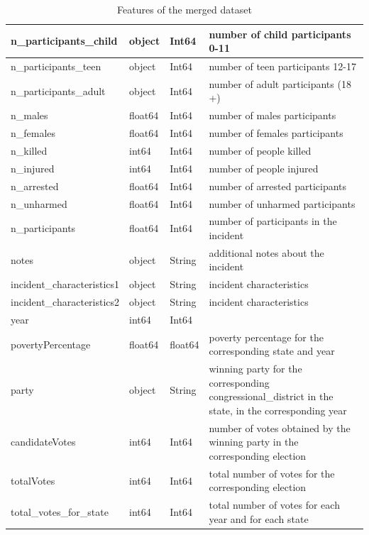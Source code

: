 \documentclass[10pt,a4paper]{report}
\begin{document}
\begin{table}
\begin{small}
\begin{tabular}{|l|l|l|p{7cm}|}
		\hline
		n\_participants\_child & object & Int64 & number of child participants 0-11\\
		\hline
		n\_participants\_teen & object & Int64 & number of teen participants 12-17\\
		\hline
		n\_participants\_adult & object & Int64 & number of adult participants (18 +)\\
		\hline
		n\_males & float64 & Int64 & number of males participants\\
		\hline
		n\_females & float64 & Int64 & number of females participants\\
		\hline
		n\_killed & int64 & Int64 & number of people killed\\
		\hline
		n\_injured & int64 & Int64 & number of people injured\\
		\hline
		n\_arrested & float64 & Int64 & number of arrested participants\\
		\hline
		n\_unharmed & float64 & Int64 & number of unharmed participants\\
		\hline
		n\_participants & float64 & Int64 & number of participants in the incident\\
		\hline
		notes & object & String & additional notes about the incident\\
		\hline
		incident\_characteristics1 & object & String & incident characteristics\\
		\hline
		incident\_characteristics2 & object & String & incident characteristics\\
		\hline
		year & int64 & Int64 & \\
		\hline
		povertyPercentage & float64 & float64 & poverty percentage for the corresponding state and year\\
		\hline
		party & object & String & winning party for the corresponding congressional\_district in the state, in the corresponding year\\
		\hline
		candidateVotes & int64 & Int64 & number of votes obtained by the winning party in the corresponding election\\
		\hline
		totalVotes & int64 & Int64 & total number of votes for the corresponding election\\
		\hline
		total\_votes\_for\_state & int64 & Int64 & total number of votes for each year and for each state\\
		\hline
	\end{tabular}
	\end{small}
	\caption{Features of the merged dataset}
	\label{table01}
\end{table}
\end{document}
